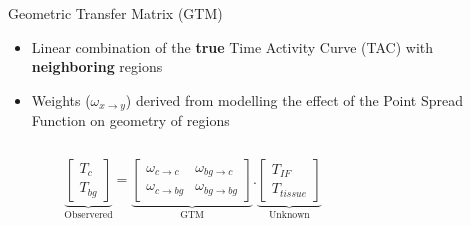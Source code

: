 \documentclass[aspectratio=169]{beamer}
\begin{document}
\begin{frame}[t]{Geometric Transfer Matrix (GTM)}
	\centering
	\begin{itemize}
		\setlength\itemsep{1em}
		\item Linear combination of the \textbf{true} Time Activity Curve (TAC) with \textbf{neighboring} regions
		\item Weights ($\omega_{x\rightarrow y}$) derived from modelling the effect of the Point Spread Function on geometry of regions
	\end{itemize}
	\vfill
	\begin{columns}
		\begin{column}{0.5\textwidth}
			\centering
			\begin{equation*}
				\underbrace{
					\begin{bmatrix}
						T_{c} \\
						T_{bg}
					\end{bmatrix}
				}_{\text{Observered}}
				=
				\underbrace{
					\begin{bmatrix}
						\omega_{c \rightarrow c}  & \omega_{bg \rightarrow c}  \\
						\omega_{c \rightarrow bg} & \omega_{bg \rightarrow bg}
					\end{bmatrix}
				}_{\text{GTM}}
				.
				\underbrace{
					\begin{bmatrix}
						T_{IF} \\
						T_{tissue}
					\end{bmatrix}
				}_{\text{Unknown}}
			\end{equation*}
		\end{column}
		\begin{column}{0.5\textwidth}
			\centering
\end{column}
\end{columns}
\end{frame}
\end{document}

